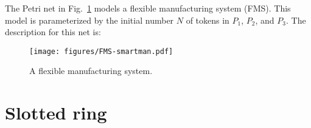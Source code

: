 The Petri net \cite{1991PNPM-Decomposition} in Fig.~\ref{FIG:fms}
models a flexible manufacturing system (FMS).
This model is parameterized by the initial number $N$ of tokens in
$P_1$, $P_2$, and $P_3$.
The {\smart} description for this net is:
%

%

\begin{figure}
  \centering
  \texttt{[image: figures/FMS-smartman.pdf]}
  \caption{A flexible manufacturing system.}
  \label{FIG:fms}
\end{figure}


\begin{comment}

Had we wanted to use a structural solution approach, we could have
partitioned the model with the statement
\begin{code}
\begin{verbatim}
partition(P1:P1wM1:P1M1:M1:P1d:P1s, P12s:P12M3:M3:P12wM3:P12:P1wP2:P2wP1,
  P2:P2wM2:P2M2:M2:P2d:P2s, P3:P3M2:P3s);
\end{verbatim}
\end{code}
(which defines four submodels) and used the options
\begin{code}
\begin{verbatim}
# StateStorage MULTI_LEVEL_AVL
# MarkovStorage MATRIX_DIAGRAM_GENERAL
\end{verbatim}
\end{code}
Note, however, that the usually more efficient methods
\begin{code}
\begin{verbatim}
# StateStorage MDD_SATURATION
# MarkovStorage MATRIX_DIAGRAM_KRONECKER
\end{verbatim}
\end{code}
cannot be used with the given partition, because some immediate transitions,
such as \Code{tP1j}, are synchronizing (i.e., they affect multiple submodels).


\end{comment}

\section{Slotted ring}

